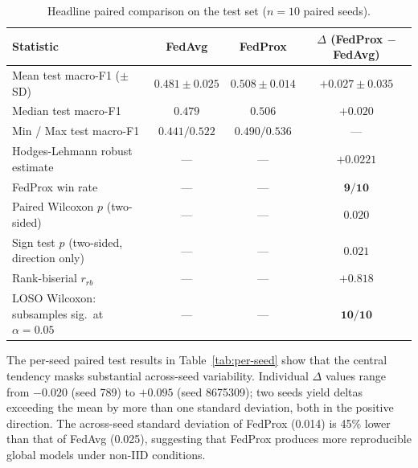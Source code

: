 \documentclass[11pt,a4paper]{article}
\begin{document}
\begin{table}[!htbp]
\centering
\small
\begin{tabular}{lccc}
\toprule
Statistic & FedAvg & FedProx & $\Delta$ (FedProx $-$ FedAvg) \\
\midrule
Mean test macro-F1 ($\pm$ SD)         & $0.481 \pm 0.025$ & $0.508 \pm 0.014$ & $\mathbf{+0.027 \pm 0.035}$ \\
Median test macro-F1                  & $0.479$           & $0.506$           & $+0.020$ \\
Min / Max test macro-F1               & $0.441 / 0.522$   & $0.490 / 0.536$   & --- \\
Hodges-Lehmann robust estimate        & ---               & ---               & $+0.0221$ \\
FedProx win rate                      & ---               & ---               & $\mathbf{9 / 10}$ \\
Paired Wilcoxon $p$ (two-sided)       & ---               & ---               & $\mathbf{0.020}$ \\
Sign test $p$ (two-sided, direction only) & ---           & ---               & $0.021$ \\
Rank-biserial $r_{rb}$                & ---               & ---               & $\mathbf{+0.818}$ \\
LOSO Wilcoxon: subsamples sig.\ at $\alpha=0.05$ & ---    & ---               & $\mathbf{10/10}$ \\
\bottomrule
\end{tabular}
\caption{Headline paired comparison on the test set ($n = 10$ paired seeds).}
\label{tab:headline}
\end{table}

The per-seed paired test results in Table~\ref{tab:per-seed} show that
the central tendency masks substantial across-seed variability.
Individual $\Delta$ values range from $-0.020$ (seed 789) to $+0.095$
(seed 8675309); two seeds yield deltas exceeding the mean by more than
one standard deviation, both in the positive direction. The
across-seed standard deviation of FedProx (0.014) is 45\% lower than
that of FedAvg (0.025), suggesting that FedProx produces more
reproducible global models under non-IID conditions.
\end{document}
